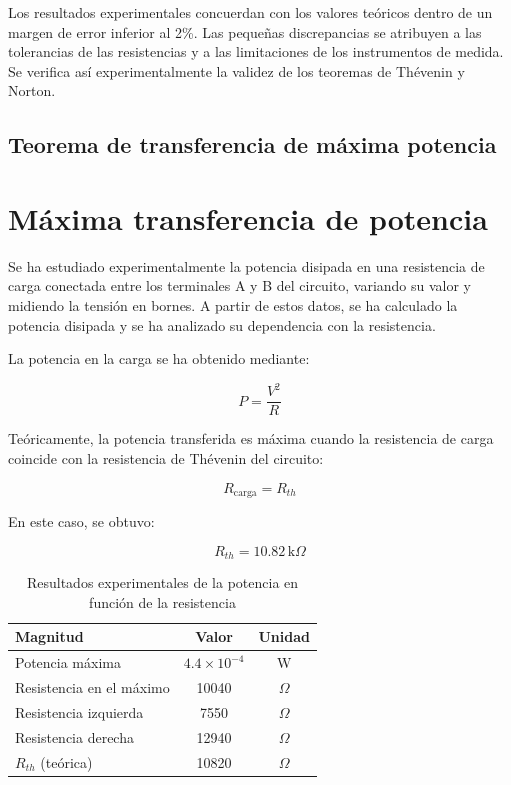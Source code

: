 \documentclass[a4paper,12pt]{article}
\begin{document}
Los resultados experimentales concuerdan con los valores teóricos dentro de un margen de error inferior al 2\%. Las pequeñas discrepancias se atribuyen a las tolerancias de las resistencias y a las limitaciones de los instrumentos de medida. Se verifica así experimentalmente la validez de los teoremas de Thévenin y Norton.

\subsection{Teorema de transferencia de máxima potencia}

\section{Máxima transferencia de potencia}

Se ha estudiado experimentalmente la potencia disipada en una resistencia de carga conectada entre los terminales A y B del circuito, variando su valor y midiendo la tensión en bornes. A partir de estos datos, se ha calculado la potencia disipada y se ha analizado su dependencia con la resistencia.

La potencia en la carga se ha obtenido mediante:

\[
P = \frac{V^2}{R}
\]

Teóricamente, la potencia transferida es máxima cuando la resistencia de carga coincide con la resistencia de Thévenin del circuito:

\[
R_{\text{carga}} = R_{th}
\]

En este caso, se obtuvo:

\[
R_{th} = 10.82\,\mathrm{k}\Omega
\]

\begin{table}[h]
\centering
\begin{tabular}{lcc}
\hline
Magnitud & Valor & Unidad \\
\hline
Potencia máxima & $4.4 \times 10^{-4}$ & W \\
Resistencia en el máximo & 10040 & $\Omega$ \\
Resistencia izquierda & 7550 & $\Omega$ \\
Resistencia derecha & 12940 & $\Omega$ \\
$R_{th}$ (teórica) & 10820 & $\Omega$ \\
\hline
\end{tabular}
\caption{Resultados experimentales de la potencia en función de la resistencia}
\end{table}
\end{document}

